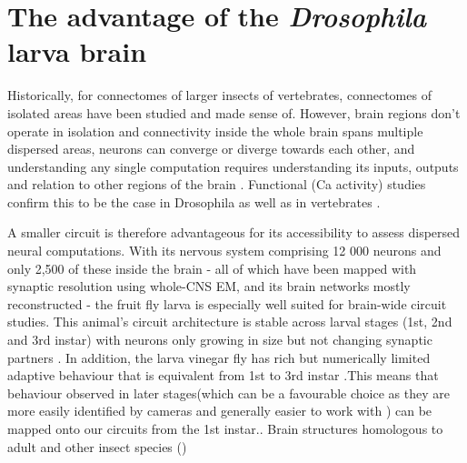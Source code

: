 

\section{The advantage of the \textit{Drosophila} larva brain}
Historically, for connectomes of larger insects of vertebrates, connectomes of isolated areas have been studied and made sense of. However, brain regions don’t operate in isolation and connectivity inside the whole  brain spans multiple dispersed areas, neurons can converge or diverge towards each other, and understanding any single computation requires understanding its inputs, outputs and relation to other regions of the brain  \citep{huang2020bricseq}.  
Functional (Ca activity) studies confirm this to be the case in Drosophila \citep{lemon2015whole}as well as in vertebrates \citep{ahrens2013whole}.

A smaller circuit is therefore advantageous for its accessibility to assess dispersed neural computations. With its nervous system comprising 12 000 neurons and only 2,500  of these inside the brain - all of which have been mapped with synaptic resolution using whole-CNS EM, and its brain networks mostly reconstructed - the fruit fly larva is especially well suited for brain-wide circuit studies. This animal’s circuit architecture is stable across larval stages (1st, 2nd and 3rd instar) with neurons only growing in size but not changing synaptic partners \citep{gerhard2017conserved}. In addition, the larva vinegar fly has rich but numerically limited adaptive behaviour that is equivalent from 1st to 3rd instar \citep{almeida2017ol1mpiad}.This means that behaviour observed in later stages(which can be a favourable choice as they are more easily identified by cameras and generally easier to work with ) can be mapped onto our circuits from the 1st instar.. Brain structures homologous to adult and other insect species (\citep{eichler2017complete, truman2023metamorphosis, carreira2018mdn})

